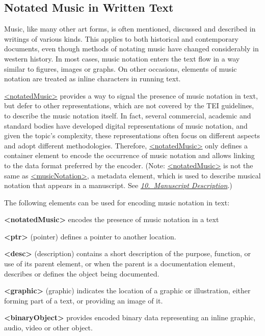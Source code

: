 \subsection[{Notated Music in Written Text}]{Notated Music in Written Text}\label{FTNM}\par
Music, like many other art forms, is often mentioned, discussed and described in writings of various kinds. This applies to both historical and contemporary documents, even though methods of notating music have changed considerably in western history. In most cases, music notation enters the text flow in a way similar to figures, images or graphs. On other occasions, elements of music notation are treated as inline characters in running text.\par
\hyperref[TEI.notatedMusic]{<notatedMusic>} provides a way to signal the presence of music notation in text, but defer to other representations, which are not covered by the TEI guidelines, to describe the music notation itself. In fact, several commercial, academic and standard bodies have developed digital representations of music notation, and given the topic's complexity, these representations often focus on different aspects and adopt different methodologies. Therefore, \hyperref[TEI.notatedMusic]{<notatedMusic>} only defines a container element to encode the occurrence of music notation and allows linking to the data format preferred by the encoder. (Note: \hyperref[TEI.notatedMusic]{<notatedMusic>} is not the same as \hyperref[TEI.musicNotation]{<musicNotation>}, a metadata element, which is used to describe musical notation that appears in a manuscript. See \textit{\hyperref[MS]{10.\ Manuscript Description}}.)\par
The following elements can be used for encoding music notation in text: 
\begin{sansreflist}
  
\item [\textbf{<notatedMusic>}] encodes the presence of music notation in a text
\item [\textbf{<ptr>}] (pointer) defines a pointer to another location.
\item [\textbf{<desc>}] (description) contains a short description of the purpose, function, or use of its parent element, or when the parent is a documentation element, describes or defines the object being documented. 
\item [\textbf{<graphic>}] (graphic) indicates the location of a graphic or illustration, either forming part of a text, or providing an image of it.
\item [\textbf{<binaryObject>}] provides encoded binary data representing an inline graphic, audio, video or other object.
\end{sansreflist}

